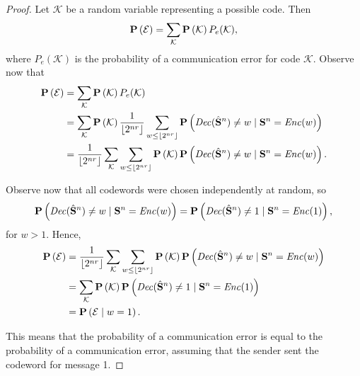 \begin{proof}
Let $\mathcal{K}$ be a random variable representing a possible code. Then
%
$$\mathbf{P}\left(\mathcal{E}\right) = \sum_{\mathcal{K}} \mathbf{P}\left(\mathcal{K}\right) P_e(\mathcal{K}),$$
%
where $P_e(\mathcal{K})$ is the probability of a communication error for code $\mathcal{K}$. Observe now that
%
\begin{align*}
\mathbf{P}\left(\mathcal{E}\right) &= \sum_{\mathcal{K}} \mathbf{P}\left(\mathcal{K}\right) P_e(\mathcal{K})\\
&= \sum_{\mathcal{K}} \mathbf{P}\left(\mathcal{K}\right) \frac{1}{\lfloor 2^{nr}\rfloor}\sum_{w \leq \lfloor 2^{nr}\rfloor} \mathbf{P}\left(\mathit{Dec}(\hat{\mathbf{S}}^n) \neq w \mid \mathbf{S}^n = \mathit{Enc}(w)\right)\\
&= \frac{1}{\lfloor 2^{nr}\rfloor} \sum_{\mathcal{K}} \sum_{w \leq \lfloor 2^{nr}\rfloor} \mathbf{P}\left(\mathcal{K}\right)  \mathbf{P}\left(\mathit{Dec}(\hat{\mathbf{S}}^n) \neq w \mid \mathbf{S}^n = \mathit{Enc}(w)\right).
\end{align*}

Observe now that all codewords were chosen independently at random, so 
%
$$\mathbf{P}\left(\mathit{Dec}(\hat{\mathbf{S}}^n) \neq w \mid \mathbf{S}^n = \mathit{Enc}(w)\right) = \mathbf{P}\left(\mathit{Dec}(\hat{\mathbf{S}}^n) \neq 1 \mid \mathbf{S}^n = \mathit{Enc}(1)\right),$$ 
%
for $w > 1$. Hence,
%
\begin{align*}
\mathbf{P}\left(\mathcal{E}\right) &= \frac{1}{\lfloor 2^{nr}\rfloor} \sum_{\mathcal{K}} \sum_{w \leq \lfloor 2^{nr}\rfloor} \mathbf{P}\left(\mathcal{K}\right)  \mathbf{P}\left(\mathit{Dec}(\hat{\mathbf{S}}^n) \neq w \mid \mathbf{S}^n = \mathit{Enc}(w)\right)\\
&= \sum_{\mathcal{K}} \mathbf{P}\left(\mathcal{K}\right)  \mathbf{P}\left(\mathit{Dec}(\hat{\mathbf{S}}^n) \neq 1 \mid \mathbf{S}^n = \mathit{Enc}(1)\right)\\
&= \mathbf{P}\left(\mathcal{E} \mid w = 1\right).
\end{align*}

This means that the probability of a communication error is equal to the probability of a communication error, assuming that the sender sent the codeword for message 1.


\end{proof}
